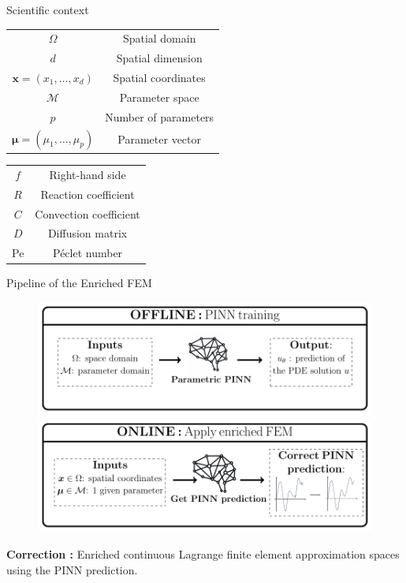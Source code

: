 \begin{frame}{Scientific context}
	\footnotesize
	\begin{table}[ht!]
		\centering
		\begin{tabular}{c|c}
			$\Omega$ & Spatial domain \\
			$d$ & Spatial dimension \\
			$\bm{x}=(x_1,\dots,x_d)$ & Spatial coordinates \\
			\hline
			$\mathcal{M}$ & Parameter space \\
			$p$ & Number of parameters \\
			$\bm{\mu}=(\mu_1,\ldots,\mu_p)$ & Parameter vector \\
		\end{tabular} \hspace{10pt}
		\begin{tabular}{c|c}
			$f$ & Right-hand side \\
			$R$ & Reaction coefficient \\
			$C$ & Convection coefficient \\
			$D$ & Diffusion matrix \\
			Pe & Péclet number \\
		\end{tabular}
	\end{table}
\end{frame}

\begin{frame}{Pipeline of the Enriched FEM}
	\begin{figure}[!ht]
		\centering
		\includegraphics[width=0.7\linewidth]{images/intro/pipeline/offline_v2.pdf}

		\includegraphics[width=0.7\linewidth]{images/intro/pipeline/online_v2.pdf}
	\end{figure}

	\textbf{Correction :} Enriched continuous Lagrange finite element approximation spaces
	using the PINN prediction.
\end{frame}

